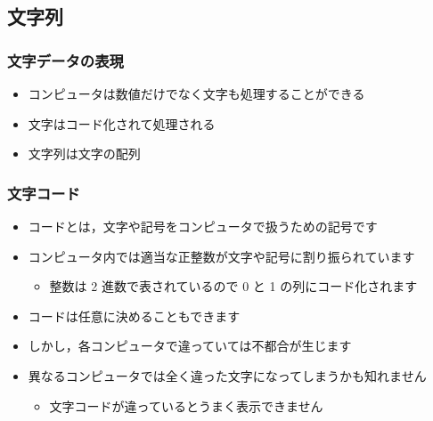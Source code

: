 %
%
\subsection{文字列}
\begin{frame}
\frametitle{文字データの表現}
  \begin{itemize}
\item コンピュータは数値だけでなく文字も処理することができる
\item 文字はコード化されて処理される
\item 文字列は文字の配列
  \end{itemize}
\end{frame}
\begin{frame}
\frametitle{文字コード}
  \begin{itemize}
\item コードとは，文字や記号をコンピュータで扱うための記号です
\item コンピュータ内では適当な正整数が文字や記号に割り振られています
    \begin{itemize}
\item 整数は 2 進数で表されているので 0 と 1 の列にコード化されます
    \end{itemize}
\item コードは任意に決めることもできます
\item しかし，各コンピュータで違っていては不都合が生じます
\item 異なるコンピュータでは全く違った文字になってしまうかも知れません
    \begin{itemize}
\item 文字コードが違っているとうまく表示できません
    \end{itemize}
  \end{itemize}
\end{frame}
